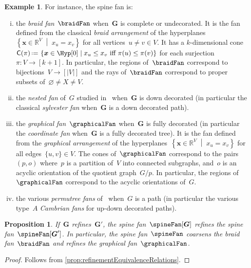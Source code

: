 \documentclass{amsart}
\newtheorem{proposition}[theorem]{Proposition}
\theoremstyle{definition}
\newtheorem{example}[theorem]{Example}
\newcommand{\R}{\mathbb{R}} %
\renewcommand{\b}[1]{{\boldsymbol{#1}}} %
\newcommand{\set}[2]{\left\{ #1 \;\middle|\; #2 \right\}} %
\newcommand{\eqdef}{\mbox{\,\raisebox{0.2ex}{\scriptsize\ensuremath{\mathrm:}}\ensuremath{=}\,}} %
\newcommand{\darkblue}{\color{darkblue}} %
\newcommand{\defn}[1]{\textsl{\darkblue #1}} %
\newcommand{\vertexSet}{V}
\newcommand{\normalCone}{\mathsf{C}} %
\begin{document}
\begin{example}
  \label{exm:spineFans}
  For instance, the spine fan is:
  \begin{enumerate}[(i)]
    \item the \defn{braid fan}~$\braidFan$ when~$\b{G}$ is complete or undecorated. It is the fan defined from the classical \defn{braid arrangement} of the hyperplanes~$\set{\b{x} \in \R^{\vertexSet}}{x_u = x_v}$ for all vertices~$u \ne v \in \vertexSet$. It has a $k$-dimensional cone~$\normalCone(\pi) \eqdef \set{\b{x} \in \Hyp[0]}{x_u \le x_v \text{ iff } \pi(u) \le \pi(v)}$ for each surjection~$\pi : \vertexSet \to [k+1]$. In particular, the regions of~$\braidFan$ correspond to bijections~${\vertexSet \to [|\vertexSet|]}$ and the rays of~$\braidFan$ correspond to proper subsets of~$\varnothing \ne X \ne \vertexSet$.
    \item the \defn{nested fan} of~$G$ studied in~\cite{CarrDevadoss, Zelevinsky} when~$\b{G}$ is down decorated (in particular the classical \defn{sylvester fan} when~$\b{G}$ is a down decorated path).
    \item the \defn{graphical fan}~$\graphicalFan$ when~$\b{G}$ is fully decorated (in particular the \defn{coordinate fan} when~$\b{G}$ is a fully decorated tree). It is the fan defined from the \defn{graphical arrangement} of the hyperplanes~$\set{\b{x} \in \R^{\vertexSet}}{x_u = x_v}$ for all edges~$\{u, v\} \in \vertexSet$. The cones of~$\graphicalFan$ correspond to the pairs~$(p,o)$ where~$p$ is a partition of~$\vertexSet$ into connected subgraphs, and~$o$ is an acyclic orientation of the quotient graph~$G/p$. In particular, the regions of~$\graphicalFan$ correspond to the acyclic orientations of~$G$.
    \item the various \defn{permutree fans} of~\cite{PilaudPons-permutrees} when~$G$ is a path (in particular the various type~$A$ \defn{Cambrian fans} for up-down decorated paths).
  \end{enumerate}
\end{example}

\begin{proposition}
  \label{prop:refinementSpineFan}
  If~$\b{G}$ refines~$\b{G}'$, the spine fan~$\spineFan[\b{G}]$ refines the spine fan~$\spineFan[\b{G}']$.
  In particular, the spine fan~$\spineFan$ coarsens the braid fan~$\braidFan$ and refines the graphical fan~$\graphicalFan$.
\end{proposition}

\begin{proof}
  Follows from \cref{prop:refinementEquivalenceRelations}.
\end{proof}
\end{document}
